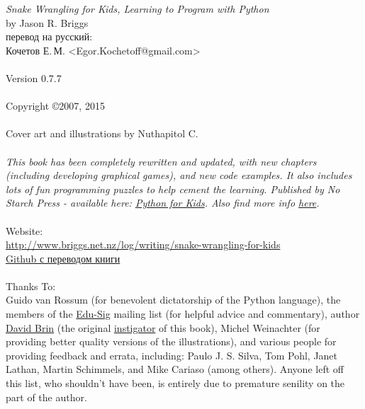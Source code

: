 \noindent
\textsf{\emph{Snake Wrangling for Kids, Learning to Program with Python}}\\
by Jason R. Briggs\\
перевод на русский:\\
Кочетов Е.\,М. <Egor.Kochetoff@gmail.com>\\
\\
Version 0.7.7
\\\\
Copyright \copyright 2007, 2015\\
\\
Cover art and illustrations by Nuthapitol C.\\
\\
\noindent
\textsf{\emph{This book has been completely rewritten and updated, with new chapters (including developing graphical games), and new code examples. It also includes lots of fun programming puzzles to help cement the learning. Published by No Starch Press - available here: \href{http://nostarch.com/pythonforkids}{Python for Kids}. Also find more info \href{http://jasonrbriggs.com/python-for-kids/}{here}.}}
\\
\\
\linebreak
\noindent
Website:\\ \href{http://www.briggs.net.nz/log/writing/snake-wrangling-for-kids}{http://www.briggs.net.nz/log/writing/snake-wrangling-for-kids}\\
\href{https://github.com/gluk47/swfk/ru}{Github с переводом книги}\\
\\
\noindent
Thanks To:\\
Guido van Rossum (for benevolent dictatorship of the Python language), the members of the \href{http://www.python.org/community/sigs/current/edu-sig/}{Edu-Sig} mailing list (for helpful advice and commentary), author \href{http://www.davidbrin.com/}{David Brin} (the original \href{http://www.salon.com/tech/feature/2006/09/14/basic/}{instigator} of this book), Michel Weinachter (for providing better quality versions of the illustrations), and various people for providing feedback and errata, including: Paulo J. S. Silva, Tom Pohl, Janet Lathan, Martin Schimmels, and Mike Cariaso (among others).  Anyone left off this list, who shouldn't have been, is entirely due to premature senility on the part of the author.\\

